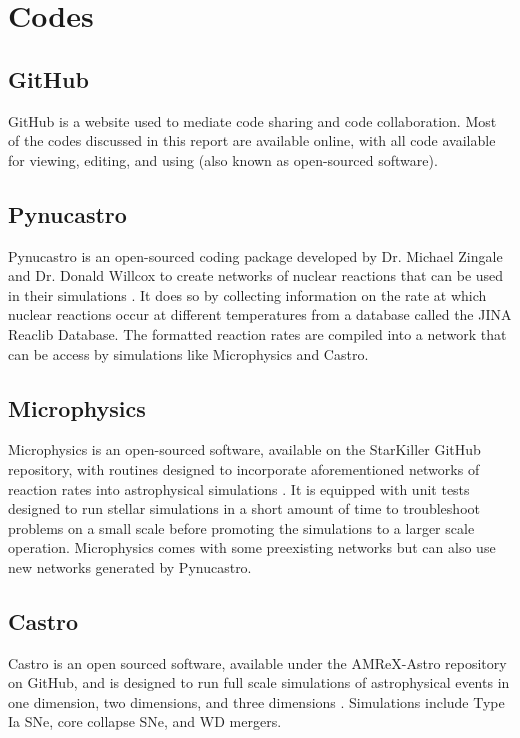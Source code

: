 \documentclass[preprint]{aastex62}
\begin{document}
\section{Codes}

  \subsection{GitHub}
  	
    GitHub is a website used to mediate code sharing and code collaboration. Most of the codes discussed in this report are available online, with all code available for viewing, editing, and using (also known as open-sourced software). 

  \subsection{Pynucastro}
    
    Pynucastro is an open-sourced coding package developed by Dr. Michael Zingale and Dr. Donald Willcox to create networks of nuclear reactions that can be used in their simulations \citep{pynucastro}. It does so by collecting information on the rate at which nuclear reactions occur at different temperatures from a database called the JINA Reaclib Database. The formatted reaction rates are compiled into a network that can be access by simulations like Microphysics and Castro. 
  
  \subsection{Microphysics}
  
    Microphysics is an open-sourced software, available on the StarKiller GitHub repository, with routines designed to incorporate aforementioned networks of reaction rates into astrophysical simulations \citep{Microphysics}.
    It is equipped with unit tests designed to run stellar simulations in a short amount of time to troubleshoot problems on a small scale before promoting the simulations to a larger scale operation. Microphysics comes with some preexisting networks but can also use new networks generated by Pynucastro. 
  
  \subsection{Castro}
  
    Castro is an open sourced software, available under the AMReX-Astro repository on GitHub, and is designed to run full scale simulations of astrophysical events in one dimension, two dimensions, and three dimensions \citep{castro}. Simulations include Type Ia SNe, core collapse SNe, and WD mergers. 
  
\end{document}
